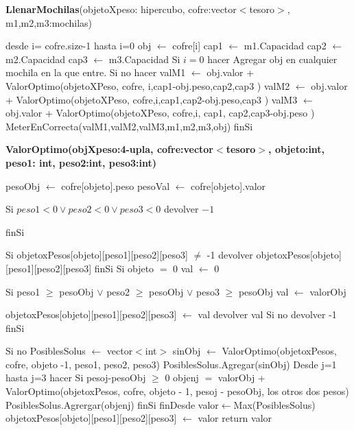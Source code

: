 \documentclass[spanish,12pt]{article}
\begin{document}
{\begin{algorithm}[H]{\textbf{LlenarMochilas}(objetoXpeso: hipercubo, cofre:vector$<$tesoro$>$, m1,m2,m3:mochilas)}
	\begin{algorithmic}[1]
		\State desde i= cofre.size-1 hasta i=0
			\State \quad obj $\gets$ cofre[i]
			\State \quad cap1 $\gets$ m1.Capacidad
			\State \quad cap2 $\gets$ m2.Capacidad
			\State \quad cap3 $\gets$ m3.Capacidad
			\State \quad Si $i=0$ hacer
				\State \quad \quad Agregar obj en cualquier mochila en la que entre.
			\State \quad Si no hacer
				\State \quad \quad valM1 $\gets$ obj.valor + ValorOptimo(objetoXPeso, cofre, i,cap1-obj.peso,cap2,cap3 )
				\State \quad \quad valM2 $\gets$ obj.valor + ValorOptimo(objetoXPeso, cofre,i,cap1,cap2-obj.peso,cap3 )
				\State \quad \quad valM3 $\gets$ obj.valor + ValorOptimo(objetoXPeso, cofre,i, cap1, cap2,cap3-obj.peso )
				\State \quad \quad  MeterEnCorrecta(valM1,valM2,valM3,m1,m2,m3,obj)
			\State \quad finSi

	\end{algorithmic}
\end{algorithm}




\begin{algorithm}[H]{\textbf{ValorOptimo(objXpeso:4-upla, cofre:vector$<$tesoro$>$, objeto:int, peso1: int, peso2:int, peso3:int)}}
	\begin{algorithmic}[1]
		\State  pesoObj $\gets$ cofre[objeto].peso 
		\State  pesoVal $\gets$ cofre[objeto].valor 

		\State Si $peso1 < 0 \vee peso2 < 0 \vee peso3 < 0$
			\State \quad devolver $-1$ 

		\State finSi

		\State Si objetoxPesos[objeto][peso1][peso2][peso3] $\neq$ -1
			\State \quad devolver objetoxPesos[objeto][peso1][peso2][peso3] 
		\State finSi
		\State Si objeto $=$ 0
			\State \quad val $\gets$ 0 

			\State \quad Si peso1 $\ge$ pesoObj $\vee$ peso2 $\ge$ pesoObj $\vee$ peso3 $\ge$ pesoObj
				\State\quad \quad  val $\gets$ valorObj 

				\State \quad \quad objetoxPesos[objeto][peso1][peso2][peso3] $\gets$ val 
				\State \quad \quad devolver val
			\State \quad Si no
				\State \quad \quad devolver -1 %
			\State \quad finSi

		\State Si no
			\State \quad PosiblesSolus $\gets$ vector$<$int$>$ 
			\State \quad sinObj $\gets$ ValorOptimo(objetoxPesos, cofre, objeto -1, peso1, peso2, peso3)
			\State \quad PosiblesSolus.Agregar(sinObj)
			\State \quad Desde j=1 hasta j=3 hacer
				\State \quad \quad Si pesoj-pesoObj $\ge$ 0
					\State \quad \quad \quad objenj $=$ valorObj + ValorOptimo(objetoxPesos, cofre, objeto - 1, pesoj - pesoObj, los otros dos pesos)
					\State \quad \quad \quad PosiblesSolus.Agrergar(objenj)
				\State \quad \quad finSi
			\State \quad finDesde	
			\State \quad  valor$\gets$Max(PosiblesSolus)
			\State \quad objetoxPesos[objeto][peso1][peso2][peso3] $\gets$ valor
			\State \quad return valor
		\EndIf



\end{algorithmic}
\end{algorithm}}
\end{document}
